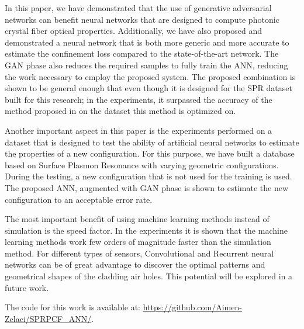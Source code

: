 \documentclass[10pt]{IEEEtran}
\begin{document}
In this paper, we have demonstrated that the use of generative adversarial networks can benefit neural networks that are designed to compute photonic crystal fiber optical properties. Additionally, we have also proposed and demonstrated a neural network that is both more generic and more accurate to estimate the confinement loss compared to the state-of-the-art network. The GAN phase also reduces the required samples to fully train the ANN, reducing the work necessary to employ the proposed system. The proposed combination is shown to be general enough that even though it is designed for the SPR dataset built for this research; in the experiments, it surpassed the accuracy of the method proposed in \cite{paper0} on the dataset this method is optimized on.

Another important aspect in this paper is the experiments performed on a dataset that is designed to test the ability of artificial neural networks to estimate the properties of a new configuration. For this purpose, we have built a database based on Surface Plasmon Resonance with varying geometric configurations. During the testing, a new configuration that is not used for the training is used. The proposed ANN, augmented with GAN phase is shown to estimate the new configuration to an acceptable error rate.

The most important benefit of using machine learning methods instead of simulation is the speed factor. In the experiments it is shown that the machine learning methods work few orders of magnitude faster than the simulation method. For different types of sensors, Convolutional and Recurrent neural networks can be of great advantage to discover the optimal patterns and geometrical shapes of the cladding air holes. This potential will be explored in a future work.

The code for this work is available at: \url{https://github.com/Aimen-Zelaci/SPRPCF_ANN/}.


	
\end{document}
